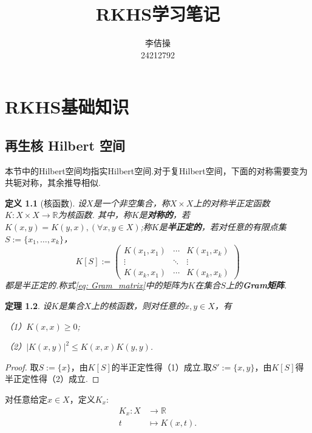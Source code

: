 \documentclass[12pt, a4paper, oneside]{ctexbook}
\title{{\Huge{\textbf{RKHS学习笔记}}}}
\author{李佶操 \\24212792}
\newtheorem{theorem}{定理}[section]
\newtheorem{definition}[theorem]{定义}
\begin{document}
\maketitle

\setcounter{page}{1}

\setcounter{page}{1}
\tableofcontents
\newpage
\setcounter{page}{1}

\chapter{RKHS基础知识}
\section{再生核 Hilbert 空间}
本节中的Hilbert空间均指实Hilbert空间.对于复Hilbert空间，下面的对称需要变为共轭对称，其余推导相似.
\begin{definition}[核函数]
    设$X$是一个非空集合，称$X\times X$上的对称半正定函数$K:X\times X\to\mathbb{R}$为核函数.
    其中，称$K$是\textbf{对称的}，若$K(x,y)=K(y,x),(\forall x,y\in X)$;称$K$是\textbf{半正定的}，若对任意的有限点集$S:=\{x_1,\dots,x_k\}$，
    \begin{equation}\label{eq: Gram_matrix}
        K[S]:=\begin{pmatrix}
            K(x_1,x_1)&\cdots&K(x_1,x_k)\\
            \vdots&\ddots&\vdots\\
            K(x_k,x_1)&\cdots&K(x_k,x_k)
        \end{pmatrix}
    \end{equation}
    都是半正定的.称式\eqref{eq: Gram_matrix}中的矩阵为$K$在集合$S$上的\textbf{Gram矩阵}.
\end{definition}

\begin{theorem}\label{thm:对称半正定K(xx)>0}
    设$K$是集合$X$上的核函数，则对任意的$x,y\in X$，有
    
    （1）$K(x,x)\geq 0$;
    
    （2）$\left|K(x,y)\right|^2\leq K(x,x)K(y,y)$.
\end{theorem}

\begin{proof}
    取$S:=\{x\}$，由$K[S]$的半正定性得（1）成立.取$S':=\{x,y\}$，由$K[S]$得半正定性得（2）成立.
\end{proof}

对任意给定$x\in X$，定义$K_x$:
\begin{equation}\label{def:k_x}
    \begin{aligned}
K_x:X & \to\mathbb{R} \\
t & \mapsto K(x,t).
\end{aligned}
\end{equation}
\end{document}
